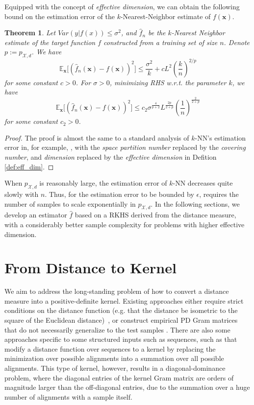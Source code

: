 \documentclass{article}
\newtheorem{theorem}{Theorem}
\newcommand{\E}{\mathbb{E}}
\newcommand{\X}{\mathcal{X}}
\newcommand{\1}{\mathbf{1}}
\newcommand{\bx}{\boldsymbol{x}}
\begin{document}
Equipped with the concept of \emph{effective dimension}, we can obtain the following bound on the estimation error of the $k$-Nearest-Neighbor estimate of $f(\bx)$.

\begin{theorem}\label{thm:nn}
Let $Var(y|f(x))\leq \sigma^2$, and $\hat f_n$ be the $k$-Nearest Neighbor estimate of the target function $f$ constructed from a training set of size $n$. Denote $p:=p_{\X,d}$. We have
$$
\E_{\bx}\biggl[\left(\hat f_n(\bx)-f(\bx)\right)^2\biggr] \leq \frac{\sigma^2}{k} + cL^2\left(\frac{k}{n}\right)^{2/p}
$$
for some constant $c>0$. For $\sigma>0$, minimizing RHS w.r.t. the parameter $k$, we have
\begin{equation}\label{knn_est}
\E_{\bx}\biggl[\left(\hat f_n(\bx)-f(\bx)\right)^2\biggr] \leq c_2\sigma^{\frac{4}{p+2}}L^{\frac{2p}{2+p}} \left(\frac{1}{n}\right)^{\frac{2}{2+p}}
\end{equation}
for some constant $c_2>0$.
\end{theorem}
\begin{proof}
The proof is almost the same to a standard analysis of $k$-NN's estimation error in, for example, \cite{gyorfi2006distribution}, with the \emph{space partition number} replaced by the \emph{covering number}, and \emph{dimension} replaced by the \emph{effective dimension} in Defition \ref{def:eff_dim}.
\end{proof}

When $p_{\X,d}$ is reasonably large, the estimation error of $k$-NN decreases quite slowly with $n$. Thus, for the estimation error to be bounded by $\epsilon$, requires the number of samples to scale exponentially in $p_{\X,d}$. In the following sections, we develop an estimator $\hat{f}$ based on a RKHS derived from the distance measure, with a considerably better sample complexity for problems with higher effective dimension.


\section{From Distance to Kernel}
\label{sec:d2ke}
We aim to address the long-standing problem of how to convert a distance measure into a positive-definite kernel. Existing approaches either require strict conditions on the distance function (e.g. that the distance be isometric to the square of the Euclidean distance)~\cite{haasdonk2004learning,scholkopf2001kernel}, or construct empirical PD Gram matrices that do not necessarily generalize to the test samples \cite{pekalska2001generalized}. There are also some approaches specific to some structured inputs such as sequences, such as \cite{collins2002convolution,cuturi2011fast} that modify a distance function over sequences to a kernel by replacing the minimization over possible alignments into a summation over all possible alignments. This type of kernel, however, results in a diagonal-dominance problem, where the diagonal entries of the kernel Gram matrix are orders of magnitude larger than the off-diagonal entries, due to the summation over a huge number of alignments with a sample itself.
\end{document}
